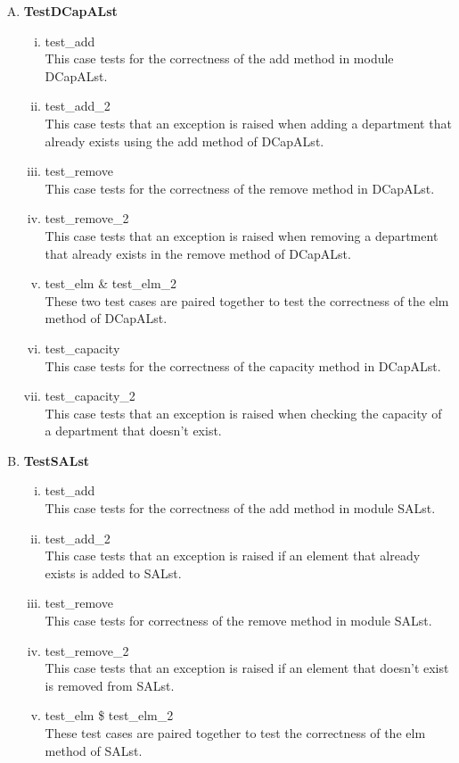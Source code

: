 \documentclass[12pt]{article}
\begin{document}
\begin{enumerate}[A.]
\item \textbf{TestDCapALst}
\begin{enumerate}[i)]
  \item test\_add\\ This case tests for the correctness of the add method in module DCapALst.
  \item test\_add\_2\\ This case tests that an exception is raised when adding a department that already exists using the add method of DCapALst.
  \item test\_remove\\ This case tests for the correctness of the remove method in DCapALst.
  \item test\_remove\_2\\ This case tests that an exception is raised when removing a department that already exists in the remove method of DCapALst.
  \item test\_elm \& test\_elm\_2\\ These two test cases are paired together to test the correctness of the elm method of DCapALst.
  \item test\_capacity\\ This case tests for the correctness of the capacity method in DCapALst.
  \item test\_capacity\_2\\ This case tests that an exception is raised when checking the capacity of a department that doesn't exist.
\end{enumerate}
  \item \textbf{TestSALst}
    \begin{enumerate}[i)]
      \item test\_add\\ This case tests for the correctness of the add method in module SALst.
      \item test\_add\_2\\ This case tests that an exception is raised if an element that already exists is added to SALst.
      \item test\_remove\\ This case tests for correctness of the remove method in module SALst.
      \item test\_remove\_2\\ This case tests that an exception is raised if an element that doesn't exist is removed from SALst.
      \item test\_elm \$ test\_elm\_2\\ These test cases are paired together to test the correctness of the elm method of SALst.

\end{enumerate}
\end{enumerate}
\end{document}
